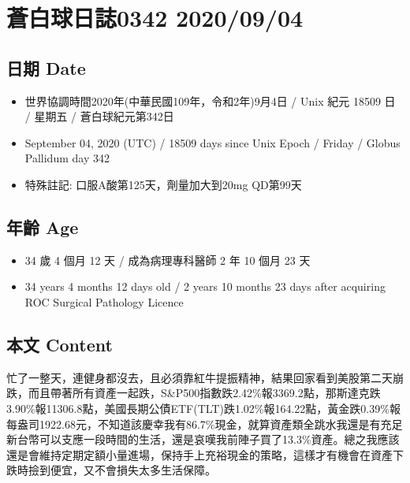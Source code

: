 \documentclass[
]{article}
\providecommand{\tightlist}{%
  \setlength{\itemsep}{0pt}\setlength{\parskip}{0pt}}
\begin{document}
\hypertarget{ux84bcux767dux7403ux65e5ux8a8c0342-20200904}{%
\section{蒼白球日誌0342
2020/09/04}\label{ux84bcux767dux7403ux65e5ux8a8c0342-20200904}}

\hypertarget{ux65e5ux671f-date-3}{%
\subsection{日期 Date}\label{ux65e5ux671f-date-3}}

\begin{itemize}
\tightlist
\item
  世界協調時間2020年(中華民國109年，令和2年)9月4日 / Unix 紀元 18509 日
  / 星期五 / 蒼白球紀元第342日
\item
  September 04, 2020 (UTC) / 18509 days since Unix Epoch / Friday /
  Globus Pallidum day 342
\item
  特殊註記: 口服A酸第125天，劑量加大到20mg QD第99天
\end{itemize}

\hypertarget{ux5e74ux9f61-age-3}{%
\subsection{年齡 Age}\label{ux5e74ux9f61-age-3}}

\begin{itemize}
\tightlist
\item
  34 歲 4 個月 12 天 / 成為病理專科醫師 2 年 10 個月 23 天
\item
  34 years 4 months 12 days old / 2 years 10 months 23 days after
  acquiring ROC Surgical Pathology Licence
\end{itemize}

\hypertarget{ux672cux6587-content-3}{%
\subsection{本文 Content}\label{ux672cux6587-content-3}}

忙了一整天，連健身都沒去，且必須靠紅牛提振精神，結果回家看到美股第二天崩跌，而且帶著所有資產一起跌，S\&P500指數跌2.42\%報3369.2點，那斯達克跌3.90\%報11306.8點，美國長期公債ETF(TLT)跌1.02\%報164.22點，黃金跌0.39\%報每盎司1922.68元，不知道該慶幸我有86.7\%現金，就算資產類全跳水我還是有充足新台幣可以支應一段時間的生活，還是哀嘆我前陣子買了13.3\%資產。總之我應該還是會維持定期定額小量進場，保持手上充裕現金的策略，這樣才有機會在資產下跌時撿到便宜，又不會損失太多生活保障。
\end{document}
